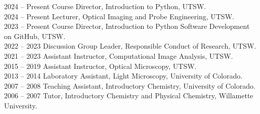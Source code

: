 2024 -- Present \hspace{14pt} Course Director, Introduction to Python, UTSW. \\
2024 -- Present \hspace{14pt} Lecturer, Optical Imaging and Probe Engineering, UTSW. \\
2023 -- Present \hspace{14pt} Course Director, Introduction to Python Software Development on GitHub, UTSW. \\
2022 -- 2023 \hspace{28pt} Discussion Group Leader, Responsible Conduct of Research, UTSW. \\ 
2021 -- 2023 \hspace{28pt} Assistant Instructor, Computational Image Analysis, UTSW. \\
2015 -- 2019 \hspace{28pt} Assistant Instructor, Optical Microscopy, UTSW. \\
2013 -- 2014 \hspace{28pt} Laboratory Assistant, Light Microscopy, University of Colorado. \\
2007 -- 2008 \hspace{28pt} Teaching Assistant, Introductory Chemistry, University of Colorado.  \\
2006 -- 2007 \hspace{28pt} Tutor, Introductory Chemistry and Physical Chemistry, Willamette University. \\
\\ 
